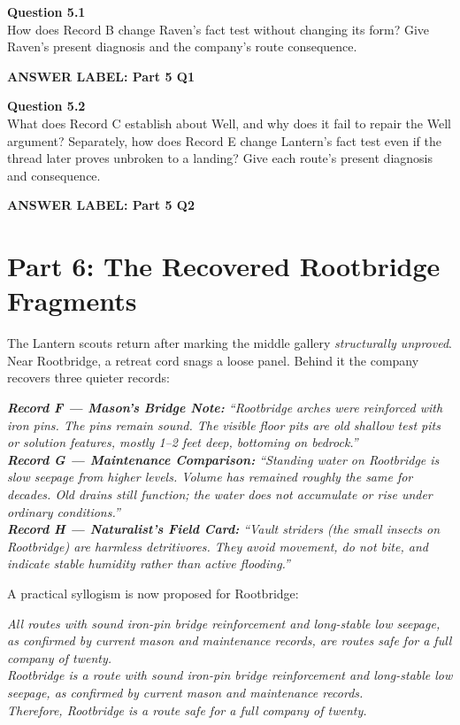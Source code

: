 \documentclass[12pt]{article}
\newcommand{\answerbox}[2]{\par\vspace{0.1em}\noindent\textbf{#1}\par\vspace{0.03em}\noindent\fbox{\begin{minipage}[t][#2]{\dimexpr\textwidth-2\fboxsep-2\fboxrule}\rule{\textwidth}{0pt}\vspace{#2}\end{minipage}}\par\vspace{0.18em}}
\newcommand{\cluebox}[1]{\par\vspace{0.12em}\noindent\begin{minipage}{\textwidth}\itshape #1\end{minipage}\par\vspace{0.12em}}
\begin{document}
\textbf{Question 5.1}\\[-0.15em]
How does Record B change Raven's fact test without changing its form? Give Raven's present diagnosis and the company's route consequence.
\answerbox{ANSWER LABEL: Part 5 Q1}{1.75in}

\textbf{Question 5.2}\\[-0.15em]
What does Record C establish about Well, and why does it fail to repair the Well argument? Separately, how does Record E change Lantern's fact test even if the thread later proves unbroken to a landing? Give each route's present diagnosis and consequence.
\answerbox{ANSWER LABEL: Part 5 Q2}{1.95in}

\newpage
\section*{Part 6: The Recovered Rootbridge Fragments}
The Lantern scouts return after marking the middle gallery \emph{structurally unproved}. Near Rootbridge, a retreat cord snags a loose panel. Behind it the company recovers three quieter records:

\cluebox{\textbf{Record F --- Mason's Bridge Note:} ``Rootbridge arches were reinforced with iron pins. The pins remain sound. The visible floor pits are old shallow test pits or solution features, mostly 1--2 feet deep, bottoming on bedrock.''\\[0.2em]
\textbf{Record G --- Maintenance Comparison:} ``Standing water on Rootbridge is slow seepage from higher levels. Volume has remained roughly the same for decades. Old drains still function; the water does not accumulate or rise under ordinary conditions.''\\[0.2em]
\textbf{Record H --- Naturalist's Field Card:} ``Vault striders (the small insects on Rootbridge) are harmless detritivores. They avoid movement, do not bite, and indicate stable humidity rather than active flooding.''}

A practical syllogism is now proposed for Rootbridge:

\cluebox{All routes with sound iron-pin bridge reinforcement and long-stable low seepage, as confirmed by current mason and maintenance records, are routes safe for a full company of twenty.\\
Rootbridge is a route with sound iron-pin bridge reinforcement and long-stable low seepage, as confirmed by current mason and maintenance records.\\
Therefore, Rootbridge is a route safe for a full company of twenty.}
\end{document}
